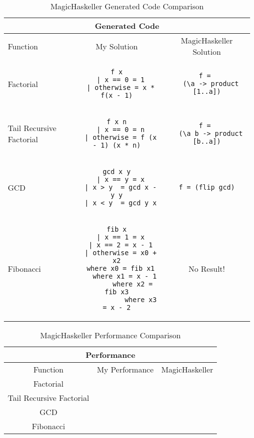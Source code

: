 \begin{table}[h!]
\centering
\begin{tabular}{| m{4em} | c | c |}
\hline
\multicolumn{3}{|c|}{\textbf{Generated Code}} \\
\hline
Function & My Solution & MagicHaskeller Solution \\
\hline
Factorial 
&
\begin{lstlisting}
f x
  | x == 0 = 1
  | otherwise = x * f(x - 1)
\end{lstlisting}
& 
\begin{lstlisting}
f = 
  (\a -> product [1..a])
\end{lstlisting}
\\
\hline
\mbox{}\newline
Tail \newline
Recursive \newline
Factorial \newline
&
\begin{lstlisting}
f x n
  | x == 0 = n
  | otherwise = f (x - 1) (x * n)
\end{lstlisting}
& 
\begin{lstlisting}
f = 
  (\a b -> product [b..a])
\end{lstlisting}
\\
\hline
GCD 
&
\begin{lstlisting}
gcd x y
  | x == y = x
  | x > y  = gcd x - y y
  | x < y  = gcd y x
\end{lstlisting}	
&
\begin{lstlisting}
f = (flip gcd)
\end{lstlisting}
\\
\hline
Fibonacci
&
\begin{lstlisting}
fib x
  | x == 1 = x
  | x == 2 = x - 1
  | otherwise = x0 + x2
  where x0 = fib x1
  	where x1 = x - 1
  		where x2 = fib x3
  			where x3 = x - 2
\end{lstlisting}
&
No Result!
\\
\hline
\end{tabular}
\caption{MagicHaskeller Generated Code Comparison }
\label{table:1}
\end{table}

\begin{table}[h!]
\centering
\begin{tabular}{|c|c|c|}
\hline
\multicolumn{3}{|c|}{\textbf{Performance}}\\
\hline
Function & My Performance & MagicHaskeller \\
\hline
Factorial & & \\
\hline
Tail Recursive Factorial & & \\
\hline
GCD & & \\
\hline
Fibonacci & & \\
\hline
\end{tabular}
\caption{MagicHaskeller Performance Comparison }
\label{table:2}
\end{table}
\mbox{} \\

